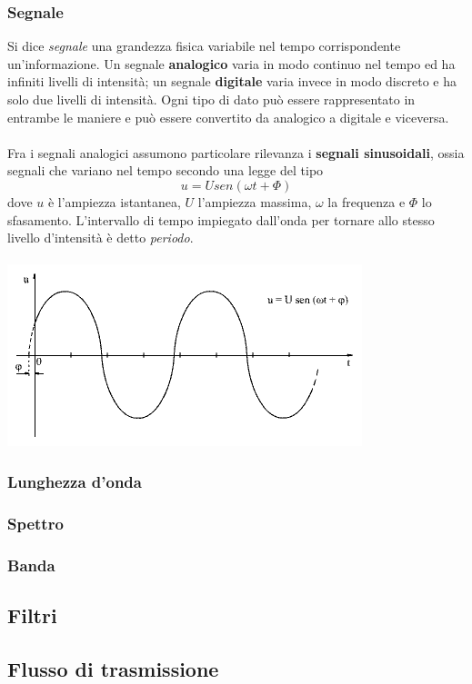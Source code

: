 \documentclass[a4paper,11pt]{paper}
\begin{document}
\subsubsection{Segnale}
Si dice \textit{segnale} una grandezza fisica variabile nel tempo corrispondente un'informazione. Un segnale \textbf{analogico} varia in modo continuo nel tempo ed ha infiniti livelli di intensità; un segnale \textbf{digitale} varia invece in modo discreto e ha solo due livelli di intensità. Ogni tipo di dato può essere rappresentato in entrambe le maniere e può essere convertito da analogico a digitale e viceversa.
\\\\Fra i segnali analogici assumono particolare rilevanza i \textbf{segnali sinusoidali}, ossia segnali che variano nel tempo secondo una legge del tipo \[u=Usen(\omega t+\Phi )\] dove $u$ è l'ampiezza istantanea, $U$ l'ampiezza massima, $\omega $ la frequenza e $\Phi $ lo sfasamento. L'intervallo di tempo impiegato dall'onda per tornare allo stesso livello d'intensità è detto \textit{periodo}.\\\\ 
\includegraphics[scale=0.5]{segnali_sin.png}
\subsubsection{Lunghezza d'onda}
\subsubsection{Spettro}
\subsubsection{Banda}
\subsection{Filtri}

\subsection{Flusso di trasmissione}
\end{document}
